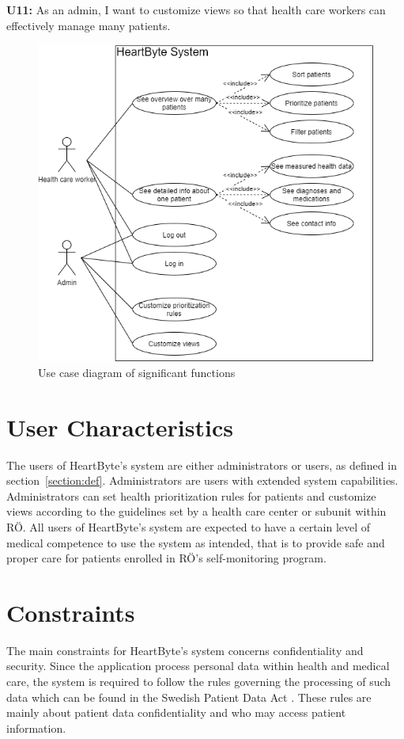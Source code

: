 \documentclass{scrreprt}
\begin{document}
\newline
\textbf{U11:} As an admin, I want to customize views so that health care workers can effectively manage many patients. 
\begin{figure}[htp]
    \centering
    \includegraphics[width=15cm]{useCase.png}
    \caption{Use case diagram of significant functions}
    \label{fig: useCaseDiag}
\end{figure}

\section{User Characteristics}
The users of HeartByte’s system are either administrators or users, as defined in section~\ref{section:def}. Administrators are users with extended system capabilities. Administrators can set health prioritization rules for patients and customize views according to the guidelines set by a health care center or subunit within RÖ. All users of HeartByte’s system are expected to have a certain level of medical competence to use the system as intended, that is to provide safe and proper care for patients enrolled in RÖ’s self-monitoring program.


\section{Constraints}
The main constraints for HeartByte’s system concerns  confidentiality and security. Since the application process personal data within health and medical care, the system is required to follow the rules governing the processing of such data which can be found in the Swedish Patient Data Act \cite{patientdatalag}. These rules are mainly about patient data confidentiality and who may access patient information.
\end{document}
